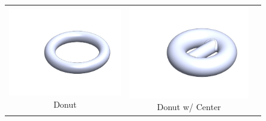 \begin{figure}[htbp]
\begin{minipage}{0.5\textwidth}
\begin{tabular}{ccc}
      \begin{minipage}{0.3\linewidth}
        \centering
        \includegraphics[width=\linewidth]{figures/parts/donut.PNG}
        \scriptsize Donut
      \end{minipage} &
      \begin{minipage}{0.3\linewidth}
        \centering
        \includegraphics[width=\linewidth]{figures/parts/Donut_w_center.PNG}
        \scriptsize Donut w/ Center
      \end{minipage} &
      \begin{minipage}{0.3\linewidth}
        \centering

\end{minipage}
\end{tabular}
\end{minipage}
\end{figure}

